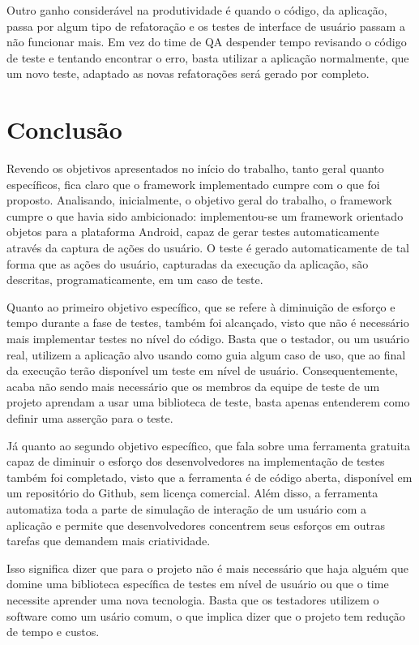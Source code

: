 \documentclass[
    12pt,       %
    openright,      %
    twoside,      %
    a4paper,      %
    english,      %
    french,       %
    spanish,      %
    brazil,       %
    ]{abntex2}
\begin{document}
      Outro ganho considerável na produtividade é quando o código, da aplicação, passa por algum tipo de
      refatoração e os testes de interface de usuário passam a não funcionar mais. Em vez do time de QA
      despender tempo revisando o código de teste e tentando encontrar o erro, basta utilizar a aplicação
      normalmente, que um novo teste, adaptado as novas refatorações será gerado por completo.

    \chapter{Conclusão}
      Revendo os objetivos apresentados no início do trabalho, tanto geral quanto específicos, fica claro
      que o framework implementado cumpre com o que foi proposto. Analisando, inicialmente, o objetivo
      geral do trabalho, o framework cumpre o que havia sido ambicionado: implementou-se um framework
      orientado objetos para a plataforma Android, capaz de gerar testes automaticamente através da captura
      de ações do usuário. O teste é gerado automaticamente de tal forma que as ações do usuário, capturadas
      da execução da aplicação, são descritas, programaticamente, em um caso de teste.

      Quanto ao primeiro objetivo específico, que se refere à diminuição de esforço e tempo durante a fase de
      testes, também foi alcançado, visto que não é necessário mais implementar testes no nível do código.
      Basta que o testador, ou um usuário real, utilizem a aplicação alvo usando como guia algum caso de uso,
      que ao final da execução terão disponível um teste em nível de usuário. Consequentemente, acaba não sendo
      mais necessário que os membros da equipe de teste de um projeto aprendam a usar uma biblioteca de teste,
      basta apenas entenderem como definir uma asserção para o teste.

      Já quanto ao segundo objetivo específico, que fala sobre uma ferramenta gratuita capaz de diminuir
      o esforço dos desenvolvedores na implementação de testes também foi completado, visto que a ferramenta
      é de código aberta, disponível em um repositório do Github, sem licença comercial. Além disso, a
      ferramenta automatiza toda a parte de simulação de interação de um usuário com a aplicação e permite
      que desenvolvedores concentrem seus esforços em outras tarefas que demandem mais criatividade.

      Isso significa dizer que para o projeto não é mais necessário que haja alguém que domine uma biblioteca
      específica de testes em nível de usuário ou que o time necessite aprender uma nova tecnologia. Basta
      que os testadores utilizem o software como um usário comum, o que implica dizer que o projeto tem
      redução de tempo e custos.
\end{document}
